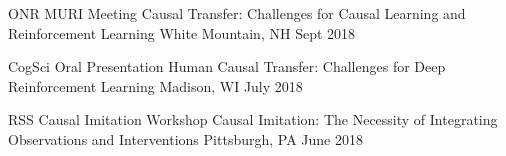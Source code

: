 


\begin{cventries}


\cventry
{ONR MURI Meeting} %
{Causal Transfer: Challenges for Causal Learning and Reinforcement Learning} %
{White Mountain, NH} %
{Sept 2018} %
{ %
}
\vspace{-3mm}


\cventry
{CogSci Oral Presentation} %
{Human Causal Transfer: Challenges for Deep Reinforcement Learning} %
{Madison, WI} %
{July 2018} %
{ %
}
\vspace{-3mm}


\cventry
{RSS Causal Imitation Workshop} %
{Causal Imitation: The Necessity of Integrating Observations and Interventions} %
{Pittsburgh, PA} %
{June 2018} %
{ %
}
\vspace{-3mm}



\end{cventries}
